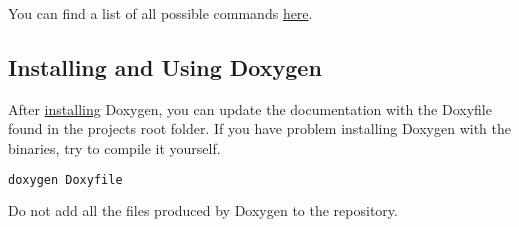 You can find a list of all possible commands \href{http://www.stack.nl/~dimitri/doxygen/manual/commands.html}{here}.

\subsection{Installing and Using Doxygen}

After \href{http://www.stack.nl/~dimitri/doxygen/download.html}{installing} Doxygen, you can update the documentation with the Doxyfile found in the projects root folder. If you have problem installing Doxygen with the binaries, try to compile it yourself. 

\begin{lstlisting}[language=bash, numbers=none]
	doxygen Doxyfile
\end{lstlisting}

\begin{mdframed}
Do not add all the files produced by Doxygen to the repository.
\end{mdframed}